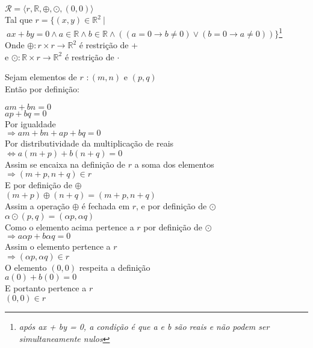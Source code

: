 \documentclass[12pt, twoside, a4]{article} %
\begin{document}
\begin{center}
    \begin{doublespacing} \vspace{-0.8cm}
        $ \mathcal{R} = \langle r, \mathbb{R},\oplus , \odot , (0,0) \rangle $
        \\
        Tal que $ r = \{  (x, y) \in \mathbb{R}^2 \ | $ \\ $\ ax + by = 0 \wedge a \in \mathbb{R} \wedge b \in \mathbb{R} \wedge ( ( a = 0 \to b \neq 0 ) \vee (b = 0 \to a \neq 0) ) \}  $\footnote{\emph{após ax + by = 0, a condição é que a e b são reais e não podem ser simultaneamente nulos}}
        \\
        Onde $ \oplus : r \times r \to \mathbb{R}^2 $ é restrição de +
        \\
        e $ \odot : \mathbb{R} \times r \to \mathbb{R}^2$ é restrição de $\cdot$
    \end{doublespacing}
\end{center}
\noindent
Sejam elementos de $r$ $: (m, n)$ e $ (p, q) $ \\
Então por definição:
\vspace{-0.5cm}
\begin{center}
    \begin{doublespacing}
        $ am + bn = 0$ 
        \\
        $ ap + bq = 0 $ 
        \\
        Por igualdade
        \\
        $\Rightarrow am + bn + ap + bq = 0$ 
        \\
        Por distributividade da multiplicação de reais
        \\
        $\Leftrightarrow  a(m + p) + b(n + q) = 0 $
        \\
        Assim se encaixa na definição de $r$ a soma dos elementos
        \\
        $\Rightarrow  (m+p, n + q) \in r$
        \\
        E por definição de $ \oplus $
        \\
        $(m+p) \oplus (n+q) = (m+p, n+q) $
        \\
        Assim a operação $ \oplus $ é fechada em $ r $, e por definição de $\odot$
        \\
        $ \alpha \odot (p,q) = (\alpha p , \alpha q) $
        \\
        Como o elemento acima pertence a $r$ por definição de $\odot$
        \\
        $\Rightarrow a \alpha p +b \alpha q = 0$
        \\
        Assim o elemento pertence a $r$
        \\
        $ \Rightarrow (\alpha p , \alpha q) \in r $
        \\
        O elemento $(0,0)$ respeita a definição
        \\
        $a(0) + b(0) = 0$
        \\
        E portanto pertence a $r$
        \\
        $(0,0) \in r$

    \end{doublespacing}
\end{center}
\end{document}
